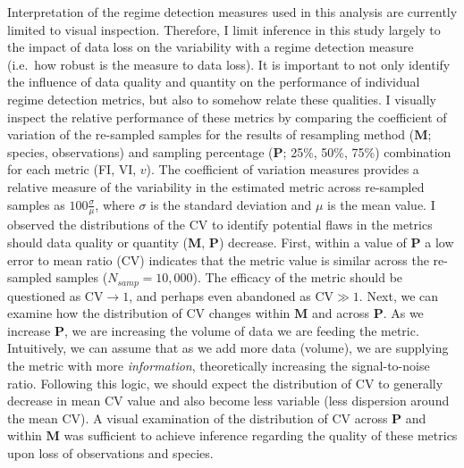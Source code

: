\documentclass[print]{nuthesis}
\begin{document}
Interpretation of the regime detection measures used in this analysis are currently limited to visual inspection. Therefore, I limit inference in this study largely to the impact of data loss on the variability with a regime detection measure (i.e.~how robust is the measure to data loss). It is important to not only identify the influence of data quality and quantity on the performance of individual regime detection metrics, but also to somehow relate these qualities. I visually inspect the relative performance of these metrics by comparing the coefficient of variation of the re-sampled samples for the results of resampling method (\(\textbf{M}\); species, observations) and sampling percentage (\(\textbf{P}\); 25\%, 50\%, 75\%) combination for each metric (FI, VI, \(v\)). The coefficient of variation measures provides a relative measure of the variability in the estimated metric across re-sampled samples as \(100\frac{\sigma}{\mu}\), where \(\sigma\) is the standard deviation and \(\mu\) is the mean value.
I observed the distributions of the CV to identify potential flaws in the metrics should data quality or quantity (\(\textbf{M}\), \(\textbf{P}\)) decrease. First, within a value of \(\textbf{P}\) a low error to mean ratio (CV) indicates that the metric value is similar across the re-sampled samples (\(N_{samp}=10,000\)). The efficacy of the metric should be questioned as CV\(\rightarrow 1\), and perhaps even abandoned as CV\(\gg1\). Next, we can examine how the distribution of CV changes within \(\textbf{M}\) and across \(\textbf{P}\). As we increase \(\textbf{P}\), we are increasing the volume of data we are feeding the metric. Intuitively, we can assume that as we add more data (volume), we are supplying the metric with more \emph{information}, theoretically increasing the signal-to-noise ratio. Following this logic, we should expect the distribution of CV to generally decrease in mean CV value and also become less variable (less dispersion around the mean CV). A visual examination of the distribution of CV across \(\textbf{P}\) and within \(\textbf{M}\) was sufficient to achieve inference regarding the quality of these metrics upon loss of observations and species.\\
\end{document}
